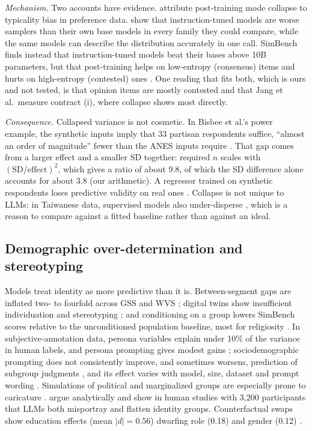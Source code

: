 \documentclass[11pt]{article}
\begin{document}
\emph{Mechanism.} Two accounts have evidence. \citet{zhang2025vs} attribute post-training mode collapse to typicality bias in preference data. \citet{jang2026} show that instruction-tuned models are worse samplers than their own base models in every family they could compare, while the same models can describe the distribution accurately in one call. SimBench finds instead that instruction-tuned models beat their bases above 10B parameters, but that post-training helps on low-entropy (consensus) items and hurts on high-entropy (contested) ones \citep{hu2025simbench}. One reading that fits both, which is ours and not tested, is that opinion items are mostly contested and that Jang et al.\ measure contract (i), where collapse shows most directly.

\emph{Consequence.} Collapsed variance is not cosmetic. In Bisbee et al.'s power example, the synthetic inputs imply that 33 partisan respondents suffice, ``almost an order of magnitude'' fewer than the ANES inputs require \citep{bisbee2024}. That gap comes from a larger effect and a smaller SD together: required $n$ scales with $(\mathrm{SD}/\text{effect})^2$, which gives a ratio of about 9.8, of which the SD difference alone accounts for about 3.8 (our arithmetic). A regressor trained on synthetic respondents loses predictive validity on real ones \citep{lukauskas2026}. Collapse is not unique to LLMs: in Taiwanese data, supervised models also under-disperse \citep{ku2026}, which is a reason to compare against a fitted baseline rather than against an ideal.

\subsection{Demographic over-determination and stereotyping}
Models treat identity as more predictive than it is. Between-segment gaps are inflated two- to fourfold across GSS and WVS \citep{chen2026synthetic}; digital twins show insufficient individuation and stereotyping \citep{peng2025funhouse}; and conditioning on a group lowers SimBench scores relative to the unconditioned population baseline, most for religiosity \citep{hu2025simbench}. In subjective-annotation data, persona variables explain under 10\% of the variance in human labels, and persona prompting gives modest gains \citep{hu2024persona}; sociodemographic prompting does not consistently improve, and sometimes worsens, prediction of subgroup judgments \citep{sun2023sociodemo}, and its effect varies with model, size, dataset and prompt wording \citep{beck2024}. Simulations of political and marginalized groups are especially prone to caricature \citep{cheng2023compost}. \citet{wang2024flatten} argue analytically and show in human studies with 3,200 participants that LLMs both misportray and flatten identity groups. Counterfactual swaps show education effects (mean $|d|=0.56$) dwarfing role (0.18) and gender (0.12) \citep{lukauskas2026}.
\end{document}
